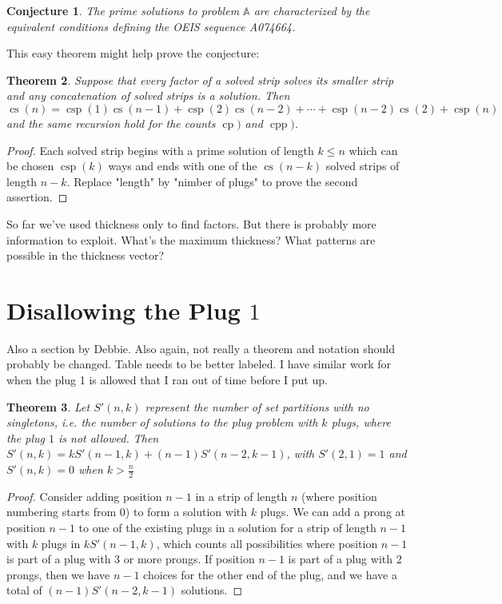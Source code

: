 \documentclass[10pt]{article}
\newtheorem{theorem}{Theorem}
\newtheorem{conjecture}[theorem]{Conjecture}
\numberwithin{equation}{section}
\DeclareMathOperator{\cp}{cp} %
\DeclareMathOperator{\cpp}{cpp} %
\DeclareMathOperator{\cs}{cs} %
\DeclareMathOperator{\csp}{csp} %
\newenvironment{anote}
               {{\textcolor{blue}{Note:}}
                 \itshape
               }
               {}
\begin{document}
\begin{conjecture}
The prime solutions to problem $\mathbb{A}$ are characterized by the
equivalent conditions defining the OEIS sequence A074664.
\end{conjecture}

This easy theorem might help prove the conjecture:

\begin{theorem}\label{thm:primerecursion}
Suppose that every factor of a solved strip solves its smaller strip and any concatenation of solved strips is a solution.
 Then
$$
\cs(n) = \csp(1)\cs(n-1) +  \csp(2)\cs(n-2) + \cdots + \csp(n-2)\cs(2) + \csp(n)
$$
and the same recursion hold for the counts $\cp)$ and $\cpp)$.
\end{theorem}
\begin{proof}
Each solved strip begins with a prime solution of length $k \le n$ which can be
chosen $\csp(k)$ ways and ends with one of the $\cs(n-k)$ solved strips of
length $n-k$. 
Replace "length" by "nimber of plugs" to prove the second assertion.
\end{proof}

\begin{anote}
So far we've used thickness only to find factors. But there is
probably more information to exploit. What's the maximum thickness?
What patterns are possible in the thickness vector?
\end{anote}

\section {Disallowing the Plug $1$}

\begin{anote}
Also a section by Debbie.  Also again, not really a theorem and notation should probably be changed. Table needs to be better labeled.  I have similar work for when the plug 1 is allowed that I ran out of time before I put up. 
\end{anote}

\begin{theorem}
Let $S'(n,k)$ represent the number of set partitions with no singletons, i.e. the number of solutions to the plug problem with $k$ plugs, where the plug $1$ is not allowed. Then $S'(n,k) = kS'(n-1,k) + (n-1)S'(n-2,k-1)$, with $S'(2,1)=1$ and $S'(n,k) =0$ when $k > \frac{n}{2}$
\end{theorem}

\begin{proof}
Consider adding position $n-1$ in a strip of length $n$ (where position numbering starts from $0$) to form a solution with $k$ plugs. We can add a prong at position $n-1$ to one of the existing plugs in a solution for a strip of length $n-1$ with $k$ plugs in $kS'(n-1,k)$, which counts all possibilities where position $n-1$ is part of a plug with 3 or more prongs. If position $n-1$ is part of a plug with 2 prongs, then we have $n-1$ choices for the other end of the plug, and we have a total of  $(n-1)S'(n-2,k-1)$ solutions. 
\end{proof}
\end{document}
